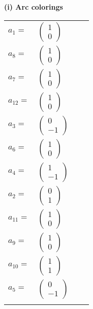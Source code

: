 \documentclass[1p]{elsarticle_modified}
\theoremstyle{definition}
\begin{document}
\flushleft \textbf{(i) Arc colorings}\\
\begin{tabular}{m{7pt} m{180pt} m{7pt} m{180pt} }
\flushright $a_{1}=$&$\begin{pmatrix}1\\0\end{pmatrix}$ \\
\flushright $a_{8}=$&$\begin{pmatrix}1\\0\end{pmatrix}$ \\
\flushright $a_{7}=$&$\begin{pmatrix}1\\0\end{pmatrix}$ \\
\flushright $a_{12}=$&$\begin{pmatrix}1\\0\end{pmatrix}$ \\
\flushright $a_{3}=$&$\begin{pmatrix}0\\-1\end{pmatrix}$ \\
\flushright $a_{6}=$&$\begin{pmatrix}1\\0\end{pmatrix}$ \\
\flushright $a_{4}=$&$\begin{pmatrix}1\\-1\end{pmatrix}$ \\
\flushright $a_{2}=$&$\begin{pmatrix}0\\1\end{pmatrix}$ \\
\flushright $a_{11}=$&$\begin{pmatrix}1\\0\end{pmatrix}$ \\
\flushright $a_{9}=$&$\begin{pmatrix}1\\0\end{pmatrix}$ \\
\flushright $a_{10}=$&$\begin{pmatrix}1\\1\end{pmatrix}$ \\
\flushright $a_{5}=$&$\begin{pmatrix}0\\-1\end{pmatrix}$\\&\end{tabular}
\end{document}
